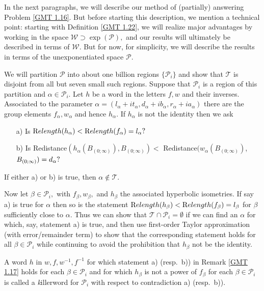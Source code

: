 \begin{remark}\label{GMT 1.17}
	In the next     paragraphs, we will describe our method of (partially) answering Problem \ref{GMT 1.16}.  But before starting this description, we
	mention a technical point: starting with Definition \ref{GMT 1.22}, we 
will realize major advantages by working in the space ${\mathcal W} \supset \exp({\mathcal P}),$ and
our results will ultimately be described in terms of ${\mathcal W}.$ But for now, for simplicity,  we will describe the results in terms of the unexponentiated space ${\mathcal P}.$

We will partition ${\mathcal P}$ into about one billion regions
$\{{\mathcal P}_i\}$ and show that ${\mathcal T}$ is disjoint from all but seven small such regions.   Suppose that
${\mathcal P}_i$ is a region of this partition and $\alpha\in {\mathcal P}_i.$  Let $h$ be a word in the
letters $f,w$ and their inverses.  Associated to the parameter
$\alpha=(l_\alpha+it_\alpha, d_\alpha+ib_\alpha, r_\alpha
+ia_\alpha)$ there are the group elements
$f_\alpha, w_\alpha$ and hence $h_\alpha.$ 
If $h_\alpha$ is not the identity then we ask
\begin{itemize}
\item[a)]  Is ${\textrm Relength} (h_\alpha) < {\textrm Relength}(f_\alpha) = l_\alpha?$

\item[b)]  Is Redistance$(h_\alpha(B_{(0;\infty)}), B_{(0;\infty)}) < $ Redistance$(w_\alpha(B_{(0;\infty)})$, $B_{(0;\infty)})\break = d_\alpha?$
\end{itemize}
\noindent If either a) or b) is true, then $\alpha\notin {\mathcal T}.$

Now let $\beta\in {\mathcal P}_i,$
with $f_\beta, w_\beta,$ and $h_\beta$ the associated hyperbolic isometries.  If
say a) is true for $\alpha$
then so is the statement $\Relength(h_\beta) < \Relength(f_\beta)\break = l_\beta$ for
$\beta$ sufficiently close to $\alpha.$
Thus we can show that ${\mathcal T}\cap {\mathcal P}_i =\emptyset$ if we can find an $\alpha$ for
which, say, statement a) is true, and then
use first-order Taylor approximation (with error/remainder term) to show that the corresponding
statement holds for all $\beta\in {\mathcal P}_i $ while continuing to avoid the prohibition that $h_\beta$ not be the identity.
\end{remark}


\begin{definition}  \label{GMT 1.18} A word $h$ in $w,f,w^{-1},f^{-1}$ for which statement a) (resp.\ b)) in
Remark \ref{GMT 1.17}
holds for each $\beta\in {\mathcal P}_i$
and for which $h_\beta$ is not a power of $f_\beta$ for each $\beta\in {\mathcal P}_i$ is
called a {\textit killerword} for ${\mathcal P}_i$ with respect to contradiction a) (resp.\ b)).
\end{definition}

